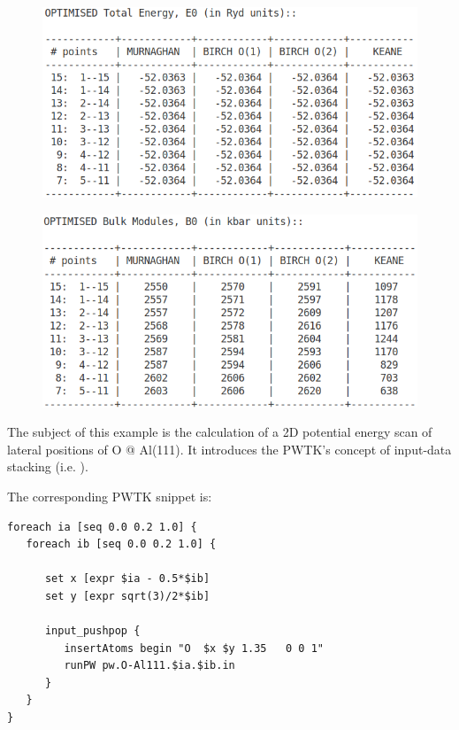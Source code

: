 \documentclass[landscape]{foils}
\begin{document}
\begin{figure}
\centering
\includegraphics[width=15.0cm]{figs/TOTAL_ENERGY.png}
\end{figure}

\begin{figure}
\centering
\includegraphics[width=15.0cm]{figs/BULK_MODULES.png}
\end{figure}


The subject of this example is the calculation of a 2D potential
energy scan of lateral positions of O @ Al(111). It introduces the
PWTK's concept of input-data stacking (i.e. ).

The corresponding PWTK snippet is:
{\codecolor\small
\begin{verbatim}
foreach ia [seq 0.0 0.2 1.0] {
   foreach ib [seq 0.0 0.2 1.0] {

      set x [expr $ia - 0.5*$ib]
      set y [expr sqrt(3)/2*$ib]

      input_pushpop {
         insertAtoms begin "O  $x $y 1.35   0 0 1"
         runPW pw.O-Al111.$ia.$ib.in
      }
   }
}
\end{verbatim}
}
\end{document}
